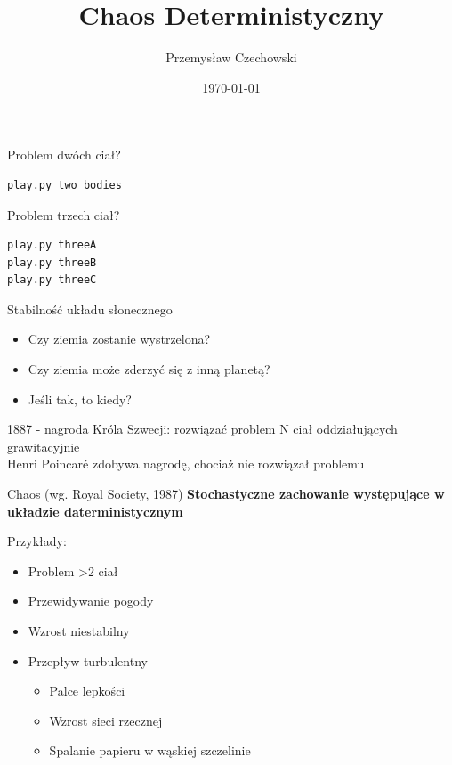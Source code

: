 \documentclass{beamer}
\begin{document}
\title{Chaos Deterministyczny} 
\author{Przemysław Czechowski} 
\date{\today} 

\frame{\titlepage} 

\begin{frame}[fragile]
Problem dwóch ciał?\pause
\begin{lstlisting}
play.py two_bodies
\end{lstlisting}
\end{frame}

\begin{frame}[fragile]
Problem trzech ciał?
\begin{lstlisting}
play.py threeA
play.py threeB
play.py threeC
\end{lstlisting}
\end{frame}

\begin{frame}{Stabilność układu słonecznego}\pause
\begin{itemize}
\item Czy ziemia zostanie wystrzelona?\pause
\item Czy ziemia może zderzyć się z inną planetą?\pause
\item Jeśli tak, to kiedy?\pause
\end{itemize} 

1887 - nagroda Króla Szwecji: rozwiązać problem N ciał oddziałujących grawitacyjnie\pause\\
Henri Poincaré zdobywa nagrodę, chociaż nie rozwiązał problemu\pause
\end{frame}

\begin{frame}{Chaos (wg. Royal Society, 1987)}
\pause
\textbf{ Stochastyczne zachowanie występujące w układzie daterministycznym}\pause

Przykłady:\pause
\begin{itemize}[<+->]
\item Problem >2 ciał
\item Przewidywanie pogody
\item Wzrost niestabilny
\item Przepływ turbulentny
	\begin{itemize}[<+->]
		\item Palce lepkości
		\item Wzrost sieci rzecznej
		\item Spalanie papieru w wąskiej szczelinie
	\end{itemize} 
\end{itemize} 
\end{frame}
\end{document}
